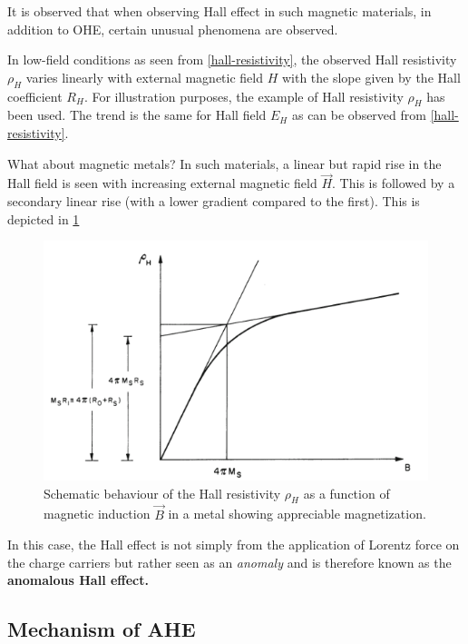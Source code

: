 It is observed that when observing Hall effect in such magnetic materials, in addition to OHE, certain unusual phenomena are observed.

In low-field conditions as seen from \cref{hall-resistivity}, the observed Hall resistivity $ \rho_H $ varies linearly with external magnetic field $ H $ with the slope given by the Hall coefficient $ R_H $. 
For illustration purposes, the example of Hall resistivity $ \rho_H $ has been used. 
The trend is the same for Hall field $ E_H $ as can be observed from \cref{hall-resistivity}.

What about magnetic metals? 
In such materials, a linear but rapid rise in the Hall field is seen with increasing external magnetic field $ \vec{H} $. 
This is followed by a secondary linear rise (with a lower gradient compared to the first). 
This is depicted in \cref{fig:hall-rho-linear} 

\begin{figure}[h!]
    \includegraphics[width=\columnwidth]{hall-rho-hurd.png}
    \caption{Schematic behaviour of the Hall resistivity $ \rho_H $ as a function of magnetic induction $ \vec{B} $ in a metal showing appreciable magnetization.}
    \label{fig:hall-rho-linear} 
\end{figure}

In this case, the Hall effect is not simply from the application of Lorentz force on the charge carriers but rather seen as an \textit{anomaly} and is therefore known as the \textbf{anomalous Hall effect.} 


\subsection{Mechanism of AHE}

